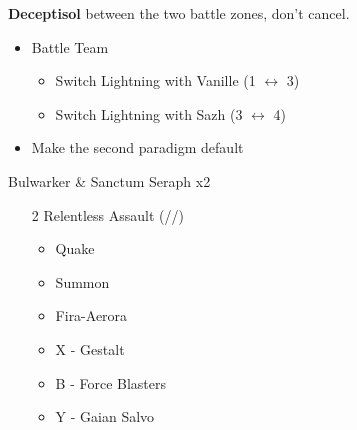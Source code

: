 \documentclass{report}
\begin{document}

\textbf{Deceptisol} between the two battle zones, don't cancel.

\begin{menu}
\begin{itemize}
    \paradigm
    \begin{itemize}
        \item Battle Team
        \begin{itemize}
            \item Switch Lightning with Vanille (1 $\leftrightarrow$ 3)
            \item Switch Lightning with Sazh (3 $\leftrightarrow$ 4)
        \end{itemize}
        \item Make the second paradigm default
    \end{itemize}
\end{itemize}
\end{menu}

\begin{battle}{Bulwarker \& Sanctum Seraph x2}
\begin{itemize}
    \item [2] Relentless Assault (\rav/\rav/\com)
    \begin{itemize}
        \item Quake
        \item Summon
        \item Fira-Aerora
        \item X - Gestalt
        \item B - Force Blasters
        \item Y - Gaian Salvo
    \end{itemize}
\end{itemize}
\end{battle}
\end{document}
